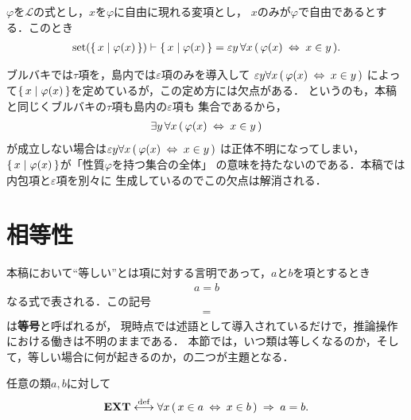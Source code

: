 	\begin{screen}
		\begin{thm}
			$\varphi$を$\mathcal{L}$の式とし，$x$を$\varphi$に自由に現れる変項とし，
			$x$のみが$\varphi$で自由であるとする．このとき
			\begin{align}
				\operatorname*{set} (\left\{\, x \mid \varphi(x)\, \right\}) \vdash \left\{\, x \mid \varphi(x)\, \right\} 
				= \varepsilon y\, \forall x\, (\, \varphi(x) \hspace{0.25em}\Leftrightarrow\hspace{0.25em} x \in y\, ).
			\end{align}
		\end{thm}
	\end{screen}
	
	ブルバキ\cite{key4}では$\tau$項を，島内\cite{key6}では$\varepsilon$項のみを導入して
	$\varepsilon y \forall x\, (\, \varphi(x) \hspace{0.25em}\Leftrightarrow\hspace{0.25em} x \in y\, )$
	によって$\left\{\, x \mid \varphi(x)\, \right\}$を定めているが，この定め方には欠点がある．
	というのも，本稿と同じくブルバキ\cite{key4}の$\tau$項も島内\cite{key6}の$\varepsilon$項も
	集合であるから，
	\begin{align}
		\exists y\, \forall x\, (\, \varphi(x) \hspace{0.25em}\Leftrightarrow\hspace{0.25em} x \in y\, )
	\end{align}
	が成立しない場合は$\varepsilon y \forall x\, (\, \varphi(x) \hspace{0.25em}\Leftrightarrow\hspace{0.25em} x \in y\, )$
	は正体不明になってしまい，$\left\{\, x \mid \varphi(x)\, \right\}$が「性質$\varphi$を持つ集合の全体」
	の意味を持たないのである．本稿では内包項と$\varepsilon$項を別々に
	生成しているのでこの欠点は解消される．
	
\section{相等性}
	本稿において``等しい''とは項に対する言明であって，$a$と$b$を項とするとき
	\begin{align}
		a = b
	\end{align}
	なる式で表される．この記号
	\begin{align}
		=
	\end{align}
	は{\bf 等号}と呼ばれるが，
	現時点では述語として導入されているだけで，推論操作における働きは不明のままである．
	本節では，いつ類は等しくなるのか，そして，等しい場合に何が起きるのか，の二つが主題となる．
	
	\begin{screen}
		\begin{axm}
			任意の類$a,b$に対して
			\begin{align}
				\mbox{{\bf EXT}} \overset{\mathrm{def}}{\longleftrightarrow} \forall x\, (\, x \in a \hspace{0.25em}\Leftrightarrow\hspace{0.25em} x \in b\, ) 
				\hspace{0.25em}\Rightarrow\hspace{0.25em} a=b.
			\end{align}
		\end{axm}
	\end{screen}
	
